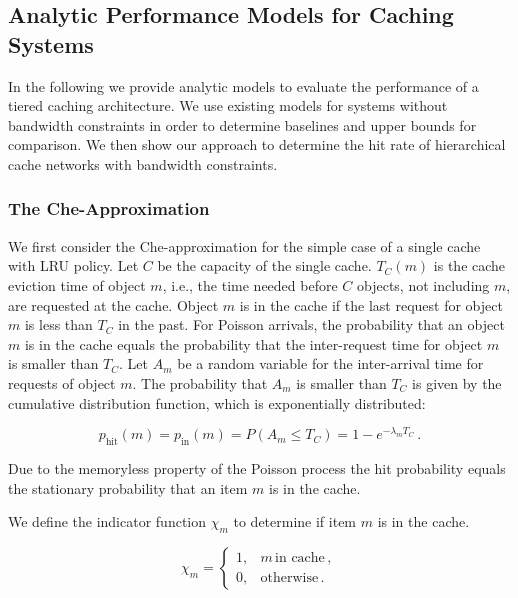 \subsection{Analytic Performance Models for Caching Systems}

In the following we provide analytic models to evaluate the performance of a tiered caching architecture.
We use existing models for systems without bandwidth constraints in order to determine baselines and upper bounds for comparison.
We then show our approach to determine the hit rate of hierarchical cache networks with bandwidth constraints.

\subsubsection{The Che-Approximation}

We first consider the Che-approximation \cite{che2002hierarchical} for the simple case of a single cache with LRU policy.
Let $C$ be the capacity of the single cache.
$T_C(m)$ is the cache eviction time of object $m$, i.e., the time needed before $C$ objects, not including $m$, are requested at the cache.
Object $m$ is in the cache if the last request for object $m$ is less than $T_C$ in the past.
For Poisson arrivals, the probability that an object $m$ is in the cache equals the probability that the inter-request time for object $m$ is smaller than $T_C$.
Let $A_m$ be a random variable for the inter-arrival time for requests of object $m$.
The probability that $A_m$ is smaller than $T_C$ is given by the cumulative distribution function, which is exponentially distributed:

\begin{equation}
	p_\text{hit}(m) = p_\text{in}(m) = P(A_m \leq T_C) = 1-e^{-\lambda_m T_C} \, .
\end{equation}

Due to the memoryless property of the Poisson process the hit probability equals the stationary probability that an item $m$ is in the cache.

We define the indicator function $\chi_m$ to determine if item $m$ is in the cache.

\begin{equation}
\chi_m =
	\begin{cases}
		1, & m \, \text{in cache} \, ,\\
      		0, & \text{otherwise} \, .
	\end{cases}
\end{equation}

